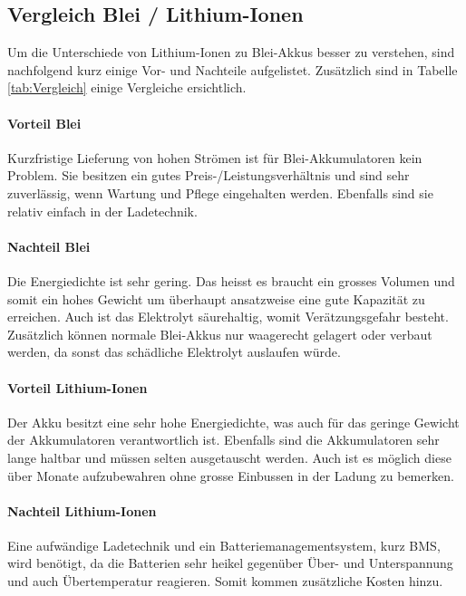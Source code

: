 \newpage

\subsection{Vergleich Blei / Lithium-Ionen} \label{kap:Vergleich_liion_pb}

Um die Unterschiede von Lithium-Ionen zu Blei-Akkus besser zu verstehen, sind nachfolgend kurz einige Vor- und Nachteile aufgelistet. Zusätzlich sind in Tabelle \ref{tab:Vergleich} einige Vergleiche ersichtlich.

\paragraph{Vorteil Blei}

Kurzfristige Lieferung von hohen Strömen ist für Blei-Akkumulatoren kein Problem. Sie besitzen ein gutes Preis-/Leistungsverhältnis und sind sehr zuverlässig, wenn Wartung und Pflege eingehalten werden. Ebenfalls sind sie relativ einfach in der Ladetechnik.

\paragraph{Nachteil Blei}

Die Energiedichte ist sehr gering. Das heisst es braucht ein grosses Volumen und somit ein hohes Gewicht um überhaupt ansatzweise eine gute Kapazität zu erreichen. Auch ist das Elektrolyt säurehaltig, womit Verätzungsgefahr besteht. Zusätzlich können normale Blei-Akkus nur waagerecht gelagert oder verbaut werden, da sonst das schädliche Elektrolyt auslaufen würde.

\paragraph{Vorteil Lithium-Ionen}

Der Akku besitzt eine sehr hohe Energiedichte, was auch für das geringe Gewicht der Akkumulatoren verantwortlich ist. Ebenfalls sind die Akkumulatoren sehr lange haltbar und müssen selten ausgetauscht werden. Auch ist es möglich diese über Monate aufzubewahren ohne grosse Einbussen in der Ladung zu bemerken.

\paragraph{Nachteil Lithium-Ionen}

Eine aufwändige Ladetechnik und ein Batteriemanagementsystem, kurz BMS, wird benötigt, da die Batterien sehr heikel gegenüber Über- und Unterspannung und auch Übertemperatur reagieren. Somit kommen zusätzliche Kosten hinzu.

